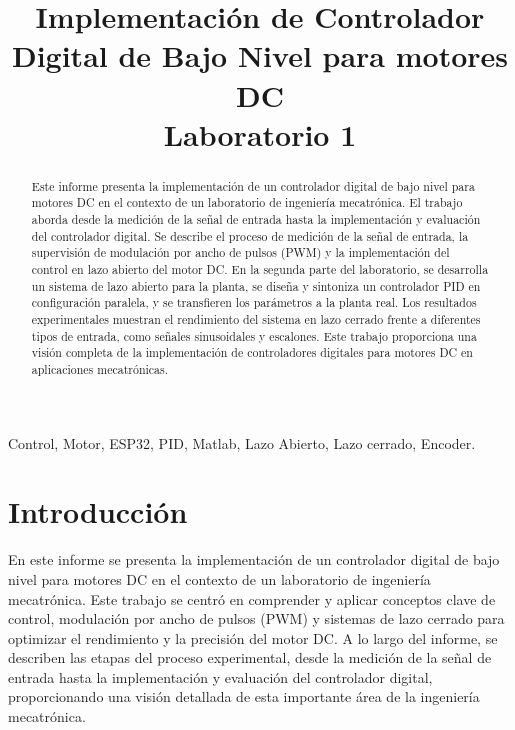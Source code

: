 \documentclass[conference,onecolumn]{IEEEtran}
\begin{document}
\title{Implementación de Controlador Digital de Bajo Nivel para motores DC\\
{\footnotesize Laboratorio 1}}

\author{
}

\maketitle
\justifying 

\begin{abstract}
Este informe presenta la implementación de un controlador digital de bajo nivel para motores DC en el contexto de un laboratorio de ingeniería mecatrónica. El trabajo aborda desde la medición de la señal de entrada hasta la implementación y evaluación del controlador digital. Se describe el proceso de medición de la señal de entrada, la supervisión de modulación por ancho de pulsos (PWM) y la implementación del control en lazo abierto del motor DC. En la segunda parte del laboratorio, se desarrolla un sistema de lazo abierto para la planta, se diseña y sintoniza un controlador PID en configuración paralela, y se transfieren los parámetros a la planta real. Los resultados experimentales muestran el rendimiento del sistema en lazo cerrado frente a diferentes tipos de entrada, como señales sinusoidales y escalones. Este trabajo proporciona una visión completa de la implementación de controladores digitales para motores DC en aplicaciones mecatrónicas.

\end{abstract}

\begin{IEEEkeywords}
Control, Motor, ESP32, PID, Matlab, Lazo Abierto, Lazo cerrado, Encoder.
\end{IEEEkeywords}

\section{Introducción}
En este informe se presenta la implementación de un controlador digital de bajo nivel para motores DC en el contexto de un laboratorio de ingeniería mecatrónica. Este trabajo se centró en comprender y aplicar conceptos clave de control, modulación por ancho de pulsos (PWM) y sistemas de lazo cerrado para optimizar el rendimiento y la precisión del motor DC. A lo largo del informe, se describen las etapas del proceso experimental, desde la medición de la señal de entrada hasta la implementación y evaluación del controlador digital, proporcionando una visión detallada de esta importante área de la ingeniería mecatrónica.
\end{document}
